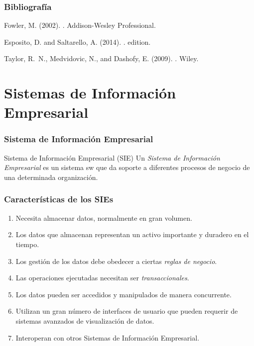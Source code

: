 \documentclass[a4paper,t,xcolor=pst,dvips,colortheme]{beamer}
\begin{document}
\begin{frame}[c]
    \frametitle{Bibliografía}
    \begin{thebibliography}{1}

        Fowler, M. (2002).
        .
        \newblock Addison-Wesley Professional.

        Esposito, D. and Saltarello, A. (2014).
        .
         edition.

        Taylor, R.~N., Medvidovic, N., and Dashofy, E. (2009).
        .
        \newblock Wiley.
    \end{thebibliography}
\end{frame}

\section{Sistemas de Información Empresarial}

\begin{frame}[c]
    \frametitle{Sistema de Información Empresarial}
    \begin{block}{Sistema de Información  Empresarial (SIE)}
        Un \emph{Sistema de Información Empresarial} es un sistema sw que da soporte a diferentes procesos de negocio de una determinada organización.
    \end{block}
\end{frame}

\begin{frame}[c]
    \frametitle{Características de los SIEs}
    \begin{enumerate}[<+->]
        \item Necesita almacenar datos, normalmente en gran volumen.
        \item Los datos que almacenan representan un activo importante y duradero en el tiempo.
        \item Los gestión de los datos debe obedecer a ciertas \emph{reglas de negocio}.
        \item Las operaciones ejecutadas necesitan ser \emph{transaccionales}.
        \item Los datos pueden ser accedidos y manipulados de manera concurrente.
        \item Utilizan un gran número de interfaces de usuario que pueden requerir de sistemas avanzados de visualización de datos.
        \item Interoperan con otros Sistemas de Información Empresarial.
    \end{enumerate}
\end{frame}
\end{document}
